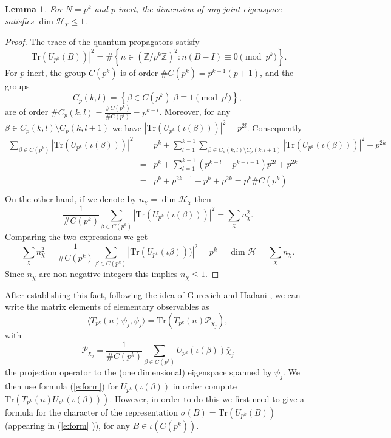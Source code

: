 \documentclass[12pt]{amsart}
\newtheorem{lem}{Lemma}[section]
\theoremstyle{definition}
\theoremstyle{remark}
\numberwithin{equation}{section}
\newcommand{\set}[1]{\left\{#1\right\}}
\newcommand{\TT}[1]{T_{#1}}
\newcommand{\calP}{\mathcal{P}}
\newcommand{\bbZ}{\mathbb{Z}}
\newcommand{\Tr}{ \mbox{Tr}}
\newcommand{\calH}{\mathcal{H}}
\begin{document}
\begin{lem}\label{l:mult}
For $N=p^k$ and $p$ inert, the dimension of any joint eigenspace
satisfies $\dim \calH_\chi\leq 1$.
\end{lem}
\begin{proof}
The trace of the quantum propagators satisfy \cite[Corollary
1.6]{Kelmer05Arith}
\[|\Tr(U_{p^k}(B))|^2=\#\set{n\in(\bbZ/p^k\bbZ)^2:n(B-I)\equiv
0\pmod{p^k}}.\] For $p$ inert, the group $C(p^k)$ is of order $\#
C(p^k)=p^{k-1}(p+1)$, and the groups
\[C_p(k,l)=\set{\beta\in C(p^k)|\beta\equiv 1\pmod{p^l}},\]
 are of order $\# C_p(k,l)=\frac{\# C(p^k)}{\# C(p^l)}=p^{k-l}$.
Moreover, for any $\beta\in C_{p}(k,l)\setminus C_{p}(k,l+1)$ we
have
 $|\Tr(U_{p^k}(\iota(\beta)))|^2=p^{2l}$.
Consequently
 \begin{eqnarray*}
 \sum_{\beta\in C(p^k)}
 |\Tr(U_{p^k}(\iota(\beta)))|^2 & = & p^{k}+\sum_{l=1}^{k-1} \sum_{\beta\in C_p(k,l)\setminus
 C_p(k,l+1)}\!\!\!\!\!\!\!\!\!|\Tr(U_{p^k}(\iota(\beta)))|^2+p^{2k}\\
 & = & p^{k}+\sum_{l=1}^{k-1} (p^{k-l}-p^{k-l-1})p^{2l}+ p^{2k}\\
 & = & p^{k}+p^{2k-1}-p^{k}+p^{2k}=p^k\#C(p^k)\\
\end{eqnarray*}
On the other hand, if we denote by $n_\chi=\dim\calH_\chi$ then
\[\frac{1}{\# C(p^k)}\sum_{\beta\in C(p^k)}
 |\Tr(U_{p^k}(\iota(\beta)))|^2=\sum_\chi n_\chi^2.\]
 Comparing the two expressions we get
 \[\sum_\chi n_\chi^2=\frac{1}{\# C(p^k)}\sum_{\beta\in C(p^k)}
 |\Tr(U_{p^k}(\iota\beta)))|^2=p^k=\dim\calH=\sum_\chi n_\chi.\]
 Since $n_\chi$ are non negative integers this implies $n_\chi\leq 1$.
\end{proof}

After establishing this fact, following the idea of Gurevich and
Hadani \cite{GurevichHadani06}, we can write the matrix elements of
elementary observables as
\[\langle \TT{p^k}(n)\psi_j,\psi_j\rangle=\Tr(\TT{p^k}(n)\calP_{\chi_j}),\]
with
\[\calP_{\chi_j}=\frac{1}{\# C(p^k)}\sum_{\beta\in C(p^k)}U_{p^k}(\iota(\beta))\bar\chi_j\]
the projection operator to the (one dimensional) eigenspace spanned
by $\psi_j$. We then use formula (\ref{e:form}) for
$U_{p^k}(\iota(\beta))$ in order compute
$\Tr(\TT{p^k}(n)U_{p^k}(\iota(\beta)))$. However, in order to do
this we first need to give a formula for the character of the
representation $\sigma(B)=\Tr(U_{p^k}(B))$ (appearing in
(\ref{e:form} )), for any $B\in\iota(C(p^k))$.
\end{document}
